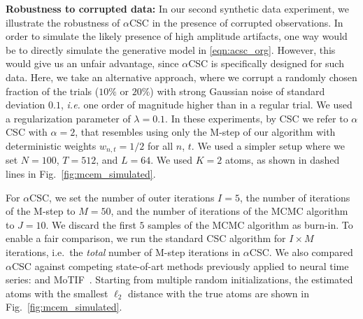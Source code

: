 %
%
%
%


\textbf{Robustness to corrupted data:} 
In our second synthetic data experiment, we illustrate the robustness of $\alpha$CSC in the presence of corrupted observations.
%
In order to simulate the likely presence of high amplitude artifacts, one way would be to directly simulate the generative model in \eqref{eqn:acsc_org}. However, this would give us an unfair advantage, since $\alpha$CSC is specifically designed for such data. Here, we take an alternative approach, where we corrupt a randomly chosen fraction of the trials ($10\%$ or $20\%$) with strong Gaussian noise of standard deviation $0.1$, \textit{i.e.} one order of magnitude higher than in a regular trial. We used a regularization parameter of $\lambda = 0.1$.
%
In these experiments, by CSC we refer to $\alpha$CSC with $\alpha=2$, that resembles using only the M-step of our algorithm with deterministic weights $w_{n,t}=1/2$ for all $n$, $t$. We used a simpler setup where we set $N=100$, $T=512$, and $L=64$. We used $K=2$ atoms, as shown in dashed lines in Fig.~\ref{fig:mcem_simulated}.

%

%
For $\alpha$CSC, we set the number of outer iterations $I=5$, the number of iterations of the M-step to $M=50$, and the number of iterations of the MCMC algorithm to $J=10$. We discard the first $5$ samples of the MCMC algorithm as burn-in.
%
%
To enable a fair comparison, we run the standard CSC algorithm for $I\times M$ iterations, i.e.\ the \emph{total} number of M-step iterations in $\alpha$CSC. We also compared $\alpha$CSC against competing state-of-art methods previously applied to neural time series: \citet{brockmeier2016learning} and MoTIF~\citep{jost2006motif}. 
%
Starting from multiple random initializations, the estimated atoms with the smallest $\ell_2$ distance with the true atoms are shown in Fig.~\ref{fig:mcem_simulated}.

